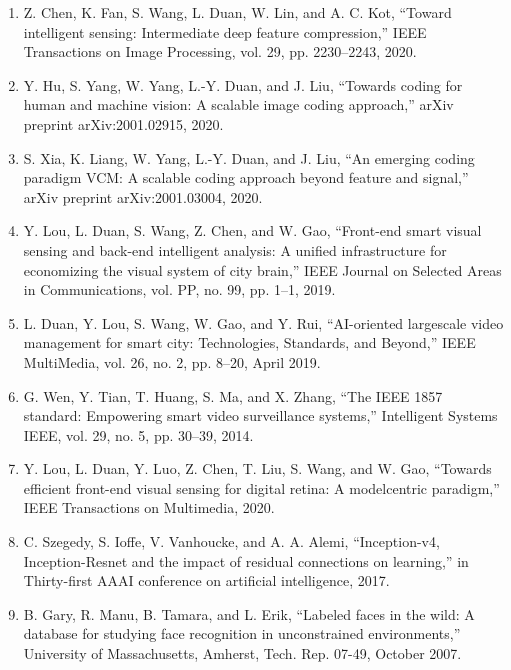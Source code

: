 \documentclass{article}
\begin{document}
\begin{enumerate}
	\item Z. Chen, K. Fan, S. Wang, L. Duan, W. Lin, and A. C. Kot, “Toward
	intelligent sensing: Intermediate deep feature compression,” IEEE Transactions on Image Processing, vol. 29, pp. 2230–2243, 2020.

	\item Y. Hu, S. Yang, W. Yang, L.-Y. Duan, and J. Liu, “Towards coding for
	human and machine vision: A scalable image coding approach,” arXiv
	preprint arXiv:2001.02915, 2020.

	\item S. Xia, K. Liang, W. Yang, L.-Y. Duan, and J. Liu, “An emerging coding
	paradigm VCM: A scalable coding approach beyond feature and signal,”
	arXiv preprint arXiv:2001.03004, 2020.

	\item Y. Lou, L. Duan, S. Wang, Z. Chen, and W. Gao, “Front-end smart visual
	sensing and back-end intelligent analysis: A unified infrastructure for
	economizing the visual system of city brain,” IEEE Journal on Selected
	Areas in Communications, vol. PP, no. 99, pp. 1–1, 2019.

	\item L. Duan, Y. Lou, S. Wang, W. Gao, and Y. Rui, “AI-oriented largescale video management for smart city: Technologies, Standards, and
	Beyond,” IEEE MultiMedia, vol. 26, no. 2, pp. 8–20, April 2019.

	\item G. Wen, Y. Tian, T. Huang, S. Ma, and X. Zhang, “The IEEE 1857
	standard: Empowering smart video surveillance systems,” Intelligent
	Systems IEEE, vol. 29, no. 5, pp. 30–39, 2014.

	\item Y. Lou, L. Duan, Y. Luo, Z. Chen, T. Liu, S. Wang, and W. Gao,
	“Towards efficient front-end visual sensing for digital retina: A modelcentric paradigm,” IEEE Transactions on Multimedia, 2020.

	\item C. Szegedy, S. Ioffe, V. Vanhoucke, and A. A. Alemi, “Inception-v4,
	Inception-Resnet and the impact of residual connections on learning,”
	in Thirty-first AAAI conference on artificial intelligence, 2017.

	\item B. Gary, R. Manu, B. Tamara, and L. Erik, “Labeled faces in the wild: A
	database for studying face recognition in unconstrained environments,”
	University of Massachusetts, Amherst, Tech. Rep. 07-49, October 2007.


\end{enumerate}
\end{document}
